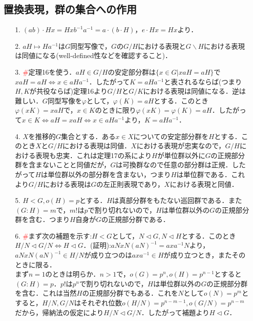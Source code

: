 \documentclass[a4paper,10pt,uplatex]{jsarticle}
\newcommand{\Set}[1]{\{#1\}}
\newcommand{\miss}{\textcolor{red}{\#}}
\numberwithin{equation}{section}
\theoremstyle{mystyle}
\begin{document}
\subsection{置換表現，群の集合への作用}
\begin{itemize}
    \item[1.] $(ab) \cdot Hx = Hx b^{-1}a^{-1} = a \cdot (b \cdot H)$，$e \cdot Hx = Hx$より．
    \item[2.] $aH \mapsto Ha^{-1}$は$G$同型写像で，$G$の$G/H$における表現と$G \backslash H$における表現は同値になる(well-defined性などを確認すること)．
    \item[3.] \miss 定理16を使う．$aH \in G/H$の安定部分群は$\Set{x \in G | xaH = aH}$で$xaH = aH \Leftrightarrow x \in aHa^{-1}$．したがって$K = aHa^{-1}$と表されるならば(つまり$H,K$が共役ならば)定理16より$G/H$と$G/K$における表現は同値になる．逆は難しい．$G$同型写像を$\varphi$として，$\varphi(K) = aH$とする．このとき$\varphi(xK) = xaH$で，$x \in K$のときに限り$\varphi(xK) = \varphi(K) = aH$．したがって$x \in K \Leftrightarrow aH = xaH \Leftrightarrow x \in aHa^{-1}$より，$K = aHa^{-1}$．
    \item[4.] $X$を推移的$G$集合とする．ある$x \in X$についての安定部分群を$H$とする．このとき$X$と$G/H$における表現は同値．$X$における表現が忠実なので，$G/H$における表現も忠実．これは定理17の系により$H$が単位群以外に$G$の正規部分群を含まないことと同値だが，$G$は可換群なので任意の部分群は正規．したがって$H$は単位群以外の部分群を含まない，つまり$H$は単位群である．これより$G/H$における表現は$G$の左正則表現であり，$X$における表現と同値．
    \item[5.] $H < G,o(H) = p$とする．$H$は真部分群をもたない巡回群である．また$(G:H) = m$で，$m!$は$p$で割り切れないので，$H$は単位群以外の$G$の正規部分群を含む．つまり$H$自身が$G$の正規部分群である．
    \item[6.] \miss まず次の補題を示す:$H<G$として，$N \triangleleft G, N \triangleleft H$とする．このとき$H/N \triangleleft G/N \Leftrightarrow H \triangleleft G$．(証明):$aNxN(aN)^{-1} = axa^{-1}N$より，$aNxN(aN)^{-1} \in H/N$が成り立つのは$axa^{-1} \in H$が成り立つとき，またそのときに限る．\\
    まず$n=1$のときは明らか．$n>1$で，$o(G) = p^n, o(H) = p^{n-1}$とすると$(G:H) = p$．$p!$は$p^n$で割り切れないので，$H$は単位群以外の$G$の正規部分群を含む．これは当然$H$の正規部分群でもある．これを$N$として$o(N) = p^m$とすると，$H/N,G/N$はそれぞれ位数$o(H/N) = p^{n-m-1}, o(G/N) = p^{n-m}$だから，帰納法の仮定により$H/N \triangleleft G/N$．したがって補題より$H \triangleleft G$．
\end{itemize}
\end{document}
